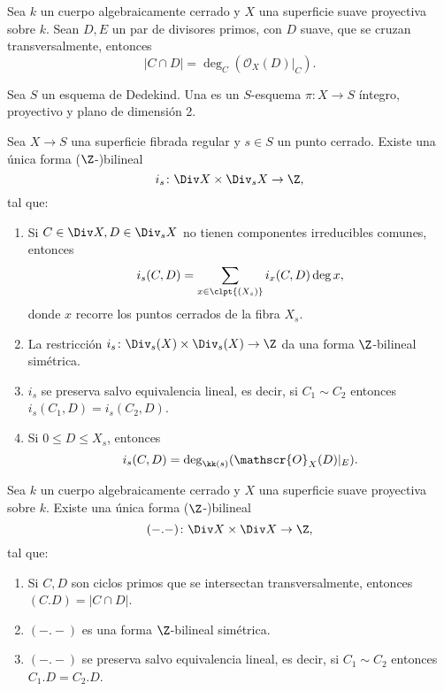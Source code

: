 \begin{prop}
	Sea $k$ un cuerpo algebraicamente cerrado y $X$ una superficie suave proyectiva sobre $k$.
	Sean $D, E$ un par de divisores primos, con $D$ suave, que se cruzan transversalmente, entonces
	$$ |C \cap D| = \deg_C( \mathscr{O}_X(D)|_C ). $$
\end{prop}

\begin{mydef}
	Sea $S$ un esquema de Dedekind.
	Una  es un $S$-esquema $\pi \colon X \to S$ íntegro, proyectivo
	y plano de dimensión 2.
\end{mydef}

\begin{thmi}
	Sea $X \to S$ una superficie fibrada regular y $s \in S$ un punto cerrado.
	Existe una única forma ($\Z$-)bilineal
	$$ i_s \colon \Div X \times \Div_s X \to \Z, $$
	tal que:
	\begin{enumerate}
		\item Si $C \in \Div X, D \in \Div_s X$ no tienen componentes irreducibles comunes, entonces
			$$ i_s(C, D) = \sum_{x \in \clpt{(X_s)}} i_x(C, D) \deg x, $$
			donde $x$ recorre los puntos cerrados de la fibra $X_s$.
		\item La restricción $i_s \colon \Div_s(X) \times \Div_s(X) \to \Z$ da una forma $\Z$-bilineal simétrica.
		\item $i_s$ se preserva salvo equivalencia lineal, es decir, si $C_1 \sim C_2$ entonces $i_s(C_1, D) = i_s(C_2, D)$.
		\item Si $0 \le D \le X_s$, entonces
			$$ i_s(C, D) = \deg_{\kk(s)}( \mathscr{O}_X(D)|_E ). $$
	\end{enumerate}
\end{thmi}

\begin{thmi}
	Sea $k$ un cuerpo algebraicamente cerrado y $X$ una superficie suave proyectiva sobre $k$.
	Existe una única forma ($\Z$-)bilineal
	$$ (-.-) \colon \Div X \times \Div X \to \Z, $$
	tal que:
	\begin{enumerate}
		\item Si $C, D$ son ciclos primos que se intersectan transversalmente, entonces $(C.D) = |C \cap D|$.
		\item $(-.-)$ es una forma $\Z$-bilineal simétrica.
		\item $(-.-)$ se preserva salvo equivalencia lineal, es decir, si $C_1 \sim C_2$ entonces $C_1.D = C_2.D$.
	\end{enumerate}
\end{thmi}

